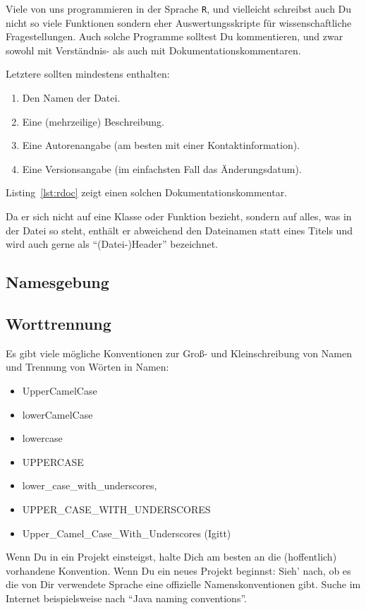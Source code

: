 \documentclass[twoside]{scrartcl}
\providecommand{\R}{\texttt{R}}
\begin{document}


Viele von uns programmieren in der Sprache \R{}, und vielleicht schreibst 
auch Du nicht so viele Funktionen sondern eher Auswertungsskripte f\"u{}r 
wissenschaftliche Fragestellungen. 
Auch solche Programme solltest Du kommentieren, und zwar sowohl mit
Verst\"a{}ndnis- als auch mit Dokumentationskommentaren. 

Letztere sollten mindestens enthalten:
\begin{enumerate}
    \item Den Namen der Datei.
    \item Eine (mehrzeilige) Beschreibung.
    \item Eine Autorenangabe (am besten mit einer Kontaktinformation).
    \item Eine Versionsangabe (im einfachsten Fall das \"A{}nderungsdatum).
\end{enumerate}

Listing~\ref{lst:rdoc} zeigt einen solchen Dokumentationskommentar. 

Da er sich nicht auf eine Klasse oder Funktion bezieht, sondern auf alles, was 
in der Datei so steht, enth\"a{}lt er abweichend den Dateinamen statt eines 
Titels und wird auch gerne als "`(Datei-)Header"' bezeichnet.




\subsection{Namesgebung\label{sec:naming}}
\subsection{Worttrennung}
Es gibt viele m\"o{}gliche Konventionen zur Gro\ss{}- und Kleinschreibung  von
Namen und
Trennung von W\"o{}rten in Namen:
\begin{itemize}
\item UpperCamelCase
\item lowerCamelCase
\item lowercase
\item UPPERCASE
\item lower\_case\_with\_underscores,
\item UPPER\_CASE\_WITH\_UNDERSCORES
\item Upper\_Camel\_Case\_With\_Underscores (Igitt)
\end{itemize}
Wenn Du in ein Projekt einsteigst, halte Dich am besten an die (hoffentlich)
vorhandene Konvention.
Wenn Du ein neues Projekt beginnst: Sieh' nach, ob es die von Dir verwendete
Sprache eine offizielle Namenskonventionen gibt. Suche im Internet 
beispielsweise nach "`Java naming conventions"'.
\end{document}

